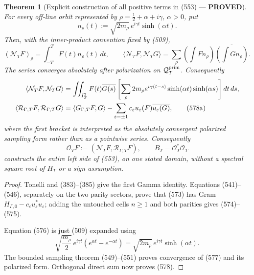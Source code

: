 \documentclass[11pt]{article}
\newtheorem{theorem}{Theorem}
\newcommand{\PROVED}{\textcolor{green!45!black}{\textbf{PROVED}}}
\begin{document}
\begin{theorem}[Explicit construction of all positive terms in (553) ---
\PROVED]
For every off-line orbit represented by
\(\rho=\frac12+\alpha+i\gamma\), \(\alpha>0\), put
\begin{equation}
 n_\rho(t):=\sqrt{2m_\rho}\,e^{i\gamma t}\sinh(\alpha t).
                                                               \tag{576}
\end{equation}
Then, with the inner-product convention fixed by (509),
\begin{equation}
 (\mathcal N_TF)_\rho=\int_{-T}^{T}F(t)n_\rho(t)\,dt,\qquad
 \langle\mathcal N_TF,\mathcal N_TG\rangle
 =\sum_{\rho}
 \left(\int F n_\rho\right)
 \overline{\left(\int G n_\rho\right)}.              \tag{577}
\end{equation}
The series converges absolutely after polarization on
\(\mathcal Q_T^{\rm prim}\).  Consequently
\begin{align}
 \langle\mathcal N_TF,\mathcal N_TG\rangle
 &=\iint_{I_T^2}F(t)\overline{G(s)}
 \left[\sum_\rho2m_\rho e^{i\gamma(t-s)}
       \sinh(\alpha t)\sinh(\alpha s)\right]dt\,ds,\notag\\
 \langle\mathcal R_{\Gamma,T}F,\mathcal R_{\Gamma,T}G\rangle
 &=\langle G_{\Gamma,T}F,G\rangle
   -\sum_{\varepsilon=\pm1}
       c_\varepsilon u_\varepsilon(F)
       \overline{u_\varepsilon(G)},                  \tag{578a}
\end{align}
where the first bracket is interpreted as the absolutely convergent
polarized sampling form rather than as a pointwise series.  Consequently
\begin{equation}
 \boxed{\mathcal O_TF:=
       (\mathcal N_TF,\mathcal R_{\Gamma,T}F),\qquad
 B_T=\mathcal O_T^*\mathcal O_T}                    \tag{578}
\end{equation}
constructs the entire left side of (553), on one stated domain, without a
spectral square root of \(H_T\) or a sign assumption.
\end{theorem}

\begin{proof}
Tonelli and (383)--(385) give the first Gamma identity.  Equations
(541)--(546), separately on the two parity sectors, prove that (573) has
Gram \(H_{\Gamma,0}-c_\varepsilon u_\varepsilon^*u_\varepsilon\);
adding the untouched cells \(n\ge1\) and both parities gives (574)--(575).

Equation (576) is just (509) expanded using
\[
 \sqrt{\frac{m_\rho}{2}}\,
 e^{i\gamma t}(e^{\alpha t}-e^{-\alpha t})
 =\sqrt{2m_\rho}\,e^{i\gamma t}\sinh(\alpha t).
\]
The bounded sampling theorem (549)--(551) proves convergence of (577) and
its polarized form.  Orthogonal direct sum now proves (578).
\end{proof}
\end{document}
